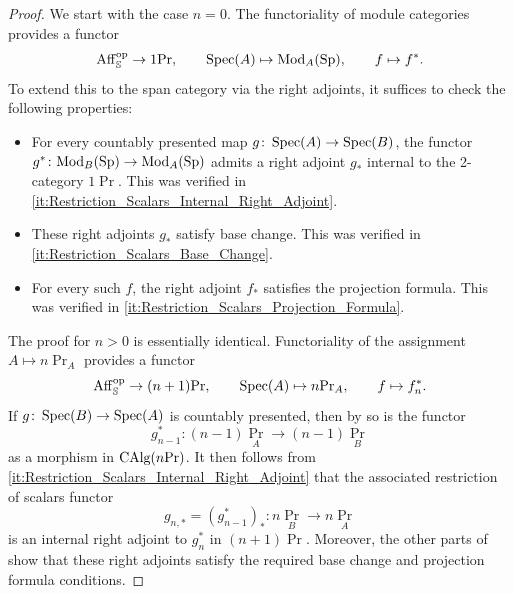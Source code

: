 \documentclass[11pt]{book}
\begin{document}
	\begin{proof}
		We start with the case $n = 0$. The functoriality of module categories provides a functor
		\[
			\operatorname{Aff}_{\operatorname{\mathbb S}}^{\textup{op}} \to 1\textup{Pr}, \qquad \operatorname{Spec}(A) \mapsto {\textup{Mod}}_A({\textup{Sp}}), \qquad f \mapsto f^*.
		\]
		To extend this to the span category via the right adjoints, it suffices to check the following properties:
		\begin{itemize}
			\item For every countably presented map $g\colon \operatorname{Spec}(A) \to \operatorname{Spec}(B)$, the functor $g^*\colon {\textup{Mod}}_B({\textup{Sp}}) \to {\textup{Mod}}_A({\textup{Sp}})$ admits a right adjoint $g_*$ internal to the 2-category $1\Pr$. This was verified in \eqref{it:Restriction_Scalars_Internal_Right_Adjoint}.
			\item These right adjoints $g_*$ satisfy base change. This was verified in \eqref{it:Restriction_Scalars_Base_Change}.
			\item For every such $f$, the right adjoint $f_*$ satisfies the projection formula. This was verified in \eqref{it:Restriction_Scalars_Projection_Formula}.
		\end{itemize}

		The proof for $n > 0$ is essentially identical. Functoriality of the assignment $A \mapsto n\Pr_A$ provides a functor
		\[
			\operatorname{Aff}_{\operatorname{\mathbb S}}^{\textup{op}} \to (n+1)\textup{Pr}, \qquad \operatorname{Spec}(A) \mapsto n\textup{Pr}_A, \qquad f \mapsto f^*_n.
		\]
		If $g\colon \operatorname{Spec}(B) \to \operatorname{Spec}(A)$ is countably presented, then by  so is the functor
		\[
			g^*_{n-1}\colon (n-1)\Pr_A \to (n-1)\Pr_B
		\]
		as a morphism in ${\textup{CAlg}}(n\textup{Pr})$. It then follows from \eqref{it:Restriction_Scalars_Internal_Right_Adjoint} that the associated restriction of scalars functor
		\[
			g_{n,*} = (g^*_{n-1})_* \colon n\Pr_B \to n\Pr_A
		\]
		is an internal right adjoint to $g^*_n$ in $(n+1)\Pr$. Moreover, the other parts of  show that these right adjoints satisfy the required base change and projection formula conditions.
	\end{proof}
\end{document}

